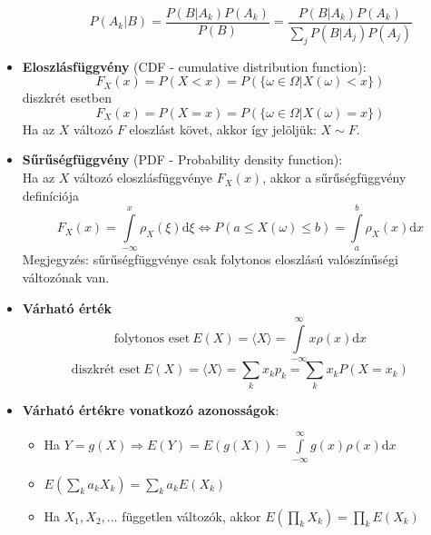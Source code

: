 \documentclass[12pt]{article}
\theoremstyle{plain}
\newcommand{\dd}{\textrm{d}}
\begin{document}
\begin{itemize}
\begin{itemize}
\begin{equation*}
                    P(A_k|B) = \frac{P(B|A_k)P(A_k)}{P(B)} = \frac{P(B|A_k)P(A_k)}{\sum\limits_{j} P(B|A_j)P(A_j)}
                \end{equation*}
        \end{itemize}
    \item \textbf{Eloszlásfüggvény} (CDF - cumulative distribution function):
        \begin{equation*}
            F_X(x) = P(X<x) = P(\{\omega\in\Omega | X(\omega)<x \})
        \end{equation*}
        diszkrét esetben 
        \begin{equation*}
            F_X(x) = P(X=x) = P(\{\omega\in\Omega | X(\omega)=x \})
        \end{equation*}
        Ha az $X$ változó $F$ eloszlást követ, akkor így jelöljük: $X\sim F$.
    \item \textbf{Sűrűségfüggvény} (PDF - Probability density function):\\
    Ha az $X$ változó eloszlásfüggvénye $F_X(x)$, akkor a sűrűségfüggvény definíciója
        \begin{equation*}
            F_X(x) = \int\limits_{-\infty}^{x}\rho_X(\xi)\dd \xi \Longleftrightarrow P(a \leq X(\omega) \leq b) = \int\limits_{a}^{b}\rho_X(x)\dd x
        \end{equation*}
        Megjegyzés: sűrűségfüggvénye csak folytonos eloszlású valószínűségi változónak van.
    \item \textbf{Várható érték}
    \begin{equation*}
        \text{folytonos eset}~E(X) = \langle X \rangle = \int\limits_{-\infty}^{\infty}x\rho(x) \dd x 
    \end{equation*}
    \begin{equation*}
        \text{diszkrét eset}~E(X) = \langle X \rangle = \sum\limits_{k} x_k p_k = \sum\limits_{k} x_k P(X=x_k)
    \end{equation*}
    \item \textbf{Várható értékre vonatkozó azonosságok}:
        \begin{itemize}
            \item Ha $Y=g(X) \Rightarrow E(Y) = E(g(X)) = {\displaystyle\int\limits_{-\infty}^{\infty}g(x)\rho(x) \dd x}$  
            \item ${\displaystyle E\left(\sum\limits_k a_k X_k\right) = \sum\limits_k a_k E(X_k)}$
            \item Ha $X_1, X_2, ...$ független változók, akkor ${\displaystyle E\left(\prod\limits_k X_k\right) = \prod\limits_k E(X_k)}$

\end{itemize}
\end{itemize}
\end{document}
